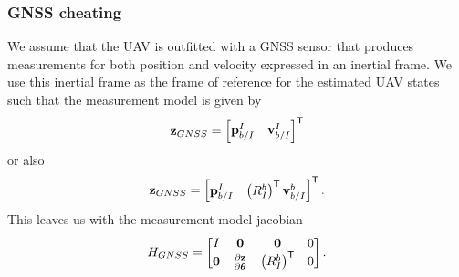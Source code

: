 \documentclass[a4paper]{article}
\begin{document}
\subsubsection{GNSS cheating}
We assume that the UAV is outfitted with a GNSS sensor that produces
measurements for both position and velocity expressed in an inertial frame. We
use this inertial frame as the frame of reference for the estimated UAV states
such that the measurement model is given by
\begin{equation}
  \boldsymbol{\mathrm{z}}_{GNSS} = 
  \begin{bmatrix}
    \boldsymbol{\mathrm{p}}_{b/I}^{I} & \boldsymbol{\mathrm{v}}_{b/I}^{I}
  \end{bmatrix}^{\mathsf{T}}
\end{equation}
or also
\begin{equation}
  \boldsymbol{\mathrm{z}}_{GNSS} = 
  \begin{bmatrix}
    \boldsymbol{\mathrm{p}}_{b/I}^{I} & \left(R_I^b\right)^{\mathsf{T}} \boldsymbol{\mathrm{v}}_{b/I}^{b}
  \end{bmatrix}^{\mathsf{T}}.
\end{equation}
This leaves us with the measurement model jacobian
\begin{equation}
  H_{GNSS} =
  \begin{bmatrix}
    I & \boldsymbol{\mathrm{0}} & \boldsymbol{\mathrm{0}} & 0 \\
    \boldsymbol{\mathrm{0}} & \frac{\partial \boldsymbol{\mathrm{z}}}{\partial \boldsymbol{\mathrm{\theta}}} & 
      \left(R_I^b\right)^{\mathsf{T}} & 0
  \end{bmatrix}.
\end{equation}




\end{document}
